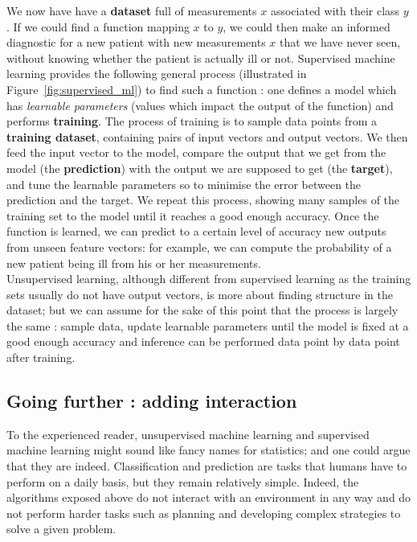 We now have have a \textbf{dataset} full of measurements $x$ associated with 
their class $y$.
If we could find a function mapping $x$ to $y$, we could then make an informed
diagnostic for a new patient with new measurements $x$ that we have never seen,
without knowing whether the patient is actually ill or not.
Supervised machine learning provides the following general process (illustrated
in Figure~\ref{fig:supervised_ml}) to find
such a function : one defines a model which has
\textit{learnable parameters} (values which impact the output of the
function) and performs \textbf{training}. The process of training is to
sample data points from a \textbf{training dataset}, containing pairs of input
vectors and output vectors. We then feed the input vector to the model, compare
the output that we get from the model (the \textbf{prediction}) 
with the output we are supposed to get (the \textbf{target}),
and tune the learnable parameters so to minimise the error between the
prediction and the target. We repeat this process, showing many samples
of the training set to the model until it reaches a good enough accuracy. Once
the function is learned, we can predict to a certain level of accuracy new 
outputs from unseen feature vectors: for example, we can compute the probability
of a new patient being ill from his or her measurements.\\

Unsupervised learning, although different from supervised learning as the
training sets usually do not have output vectors, is more about finding
structure in the dataset; but we can assume for the sake of this point that
the process is largely the same : sample data, update learnable parameters
until the model is fixed at a good enough accuracy and inference can be
performed data point by data point after training.\\

\subsection{Going further : adding interaction}
To the experienced reader, unsupervised machine learning and supervised machine
learning might sound like fancy names for statistics; and one could argue that
they are indeed. Classification and prediction are tasks that humans have
to perform on a daily basis, but they remain relatively simple. Indeed, the 
algorithms exposed above do not interact with an environment in any way and do
not perform harder tasks such as planning and developing complex strategies
to solve a given problem.\\

